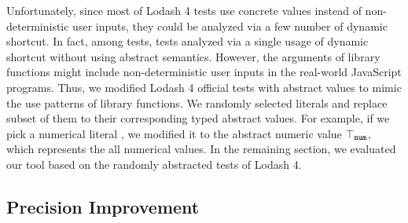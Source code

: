 Unfortunately, since most of Lodash 4 tests use concrete values instead of
non-deterministic user inputs, they could be analyzed via a few number of
dynamic shortcut.  In fact, among  tests,  tests analyzed
via a single usage of dynamic shortcut without using abstract semantics.
However, the arguments of library functions might include non-deterministic user
inputs in the real-world JavaScript programs.  Thus, we modified Lodash 4
official tests with abstract values to mimic the use patterns of library
functions.  We randomly selected literals and replace subset of them to their
corresponding typed abstract values.  For example, if we pick a numerical
literal , we modified it to the abstract numeric value
$\top_{\texttt{num}}$, which represents the all numerical values.  In the
remaining section, we evaluated our tool based on the randomly abstracted tests
of Lodash 4.

\todo


\subsection{Precision Improvement}

